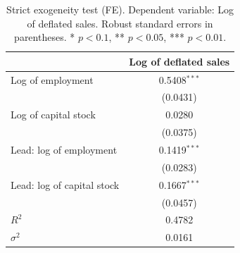 \begin{table}[!htbp]
\centering
\begin{tabular}{lc}
\toprule
 & Log of deflated sales \\
\midrule
Log of employment & 0.5408$^{***}$ \\
 & (0.0431) \\
\addlinespace
Log of capital stock & 0.0280 \\
 & (0.0375) \\
\addlinespace
Lead: log of employment & 0.1419$^{***}$ \\
 & (0.0283) \\
\addlinespace
Lead: log of capital stock & 0.1667$^{***}$ \\
 & (0.0457) \\
\midrule
$R^2$ & 0.4782 \\
$\sigma^2$ & 0.0161 \\
\bottomrule
\end{tabular}
\caption{Strict exogeneity test (FE). Dependent variable: Log of deflated sales. Robust standard errors in parentheses. * $p<0.1$, ** $p<0.05$, *** $p<0.01$.}
\label{tab:strict_exogeneity_test_fe}
\end{table}
